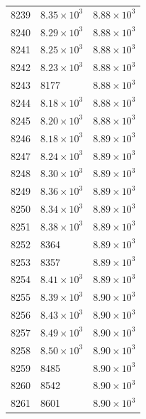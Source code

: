 \begin{table}[H]
\begin{tabular}{lll}
8239 & $\displaystyle 8.35 \times 10^{3}$ & $\displaystyle 8.88 \times 10^{3}$ \\
8240 & $\displaystyle 8.29 \times 10^{3}$ & $\displaystyle 8.88 \times 10^{3}$ \\
8241 & $\displaystyle 8.25 \times 10^{3}$ & $\displaystyle 8.88 \times 10^{3}$ \\
8242 & $\displaystyle 8.23 \times 10^{3}$ & $\displaystyle 8.88 \times 10^{3}$ \\
8243 & 8177 & $\displaystyle 8.88 \times 10^{3}$ \\
8244 & $\displaystyle 8.18 \times 10^{3}$ & $\displaystyle 8.88 \times 10^{3}$ \\
8245 & $\displaystyle 8.20 \times 10^{3}$ & $\displaystyle 8.88 \times 10^{3}$ \\
8246 & $\displaystyle 8.18 \times 10^{3}$ & $\displaystyle 8.89 \times 10^{3}$ \\
8247 & $\displaystyle 8.24 \times 10^{3}$ & $\displaystyle 8.89 \times 10^{3}$ \\
8248 & $\displaystyle 8.30 \times 10^{3}$ & $\displaystyle 8.89 \times 10^{3}$ \\
8249 & $\displaystyle 8.36 \times 10^{3}$ & $\displaystyle 8.89 \times 10^{3}$ \\
8250 & $\displaystyle 8.34 \times 10^{3}$ & $\displaystyle 8.89 \times 10^{3}$ \\
8251 & $\displaystyle 8.38 \times 10^{3}$ & $\displaystyle 8.89 \times 10^{3}$ \\
8252 & 8364 & $\displaystyle 8.89 \times 10^{3}$ \\
8253 & 8357 & $\displaystyle 8.89 \times 10^{3}$ \\
8254 & $\displaystyle 8.41 \times 10^{3}$ & $\displaystyle 8.89 \times 10^{3}$ \\
8255 & $\displaystyle 8.39 \times 10^{3}$ & $\displaystyle 8.90 \times 10^{3}$ \\
8256 & $\displaystyle 8.43 \times 10^{3}$ & $\displaystyle 8.90 \times 10^{3}$ \\
8257 & $\displaystyle 8.49 \times 10^{3}$ & $\displaystyle 8.90 \times 10^{3}$ \\
8258 & $\displaystyle 8.50 \times 10^{3}$ & $\displaystyle 8.90 \times 10^{3}$ \\
8259 & 8485 & $\displaystyle 8.90 \times 10^{3}$ \\
8260 & 8542 & $\displaystyle 8.90 \times 10^{3}$ \\
8261 & 8601 & $\displaystyle 8.90 \times 10^{3}$ \\

\end{tabular}
\end{table}
